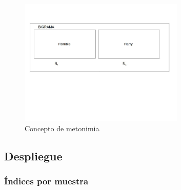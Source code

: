 \documentclass[twoside]{article}
\begin{document}
\begin{enumerate}
\begin{figure}[!H]
\centering
\includegraphics[width=0.7\textwidth]{./assets/metonimia.jpg}
\caption{\label{fig:metonimia}Concepto de metonimia}
\end{figure}
\end{enumerate}
\subsection{Despliegue}
\label{sec:orgcf9e674}

\subsubsection{Índices por muestra}
\label{sec:org1a9489e}
\end{document}
